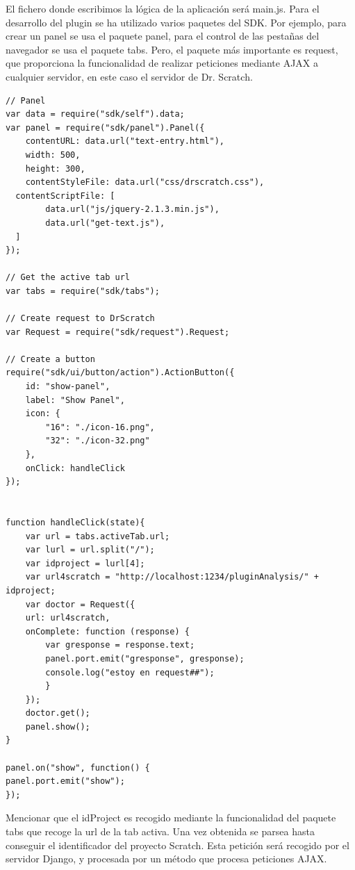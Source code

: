 \documentclass[a4paper, 12pt]{book}
\begin{document}
El fichero donde escribimos la lógica de la aplicación será main.js. Para el desarrollo
del plugin se ha utilizado varios paquetes del SDK. Por ejemplo, para crear un panel
se usa el paquete panel, para el control de las pestañas del navegador se usa el 
paquete tabs. Pero, el paquete más importante es request, que proporciona la 
funcionalidad de realizar peticiones mediante AJAX a cualquier servidor, en este caso
el servidor de Dr. Scratch. \\
\begingroup
\fontsize{8pt}{9pt}\selectfont
\begin{verbatim}
// Panel
var data = require("sdk/self").data;
var panel = require("sdk/panel").Panel({
	contentURL: data.url("text-entry.html"),
	width: 500,
	height: 300,
	contentStyleFile: data.url("css/drscratch.css"),
  contentScriptFile: [
        data.url("js/jquery-2.1.3.min.js"),
        data.url("get-text.js"), 
  ]
});

// Get the active tab url
var tabs = require("sdk/tabs");

// Create request to DrScratch
var Request = require("sdk/request").Request;

// Create a button
require("sdk/ui/button/action").ActionButton({
	id: "show-panel",
	label: "Show Panel",
	icon: {
		"16": "./icon-16.png",
		"32": "./icon-32.png"
	},
    onClick: handleClick
});


function handleClick(state){
	var url = tabs.activeTab.url;
	var lurl = url.split("/");
	var idproject = lurl[4];
	var url4scratch = "http://localhost:1234/pluginAnalysis/" + idproject;
	var doctor = Request({
	url: url4scratch,
	onComplete: function (response) {
		var gresponse = response.text;
		panel.port.emit("gresponse", gresponse);
		console.log("estoy en request##");
		}
	});
	doctor.get();
	panel.show();
}

panel.on("show", function() {
panel.port.emit("show");
});
\end{verbatim}
\endgroup

Mencionar que el idProject es recogido mediante la funcionalidad del paquete tabs
que recoge la url de la tab activa. Una vez obtenida se parsea hasta conseguir
el identificador del proyecto Scratch. Esta petición será recogido por el servidor 
Django, y procesada por un método que procesa peticiones AJAX. 

\end{document}
